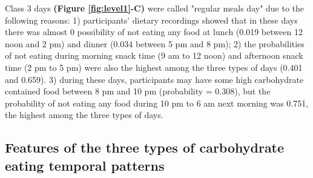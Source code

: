 Class 3 days \textbf{(Figure \ref{fig:level1}-C)} were called "regular meals day" due to the following reasons: 1) participants' dietary recordings showed that in these days there was almost 0 possibility of not eating any food at lunch (0.019 between 12 noon and 2 pm) and dinner (0.034 between 5 pm and 8 pm); 2) the probabilities of not eating during morning snack time (9 am to 12 noon) and afternoon snack time (2 pm to 5 pm) were also the highest among the three types of days (0.401 and 0.659). 3) during these days, participants may have some high carbohydrate contained food between 8 pm and 10 pm (probability = 0.308), but the probability of not eating any food during 10 pm to 6 am next morning was 0.751, the highest among the three types of days. \vspace{-0.5cm}


\subsection{Features of the three types of carbohydrate eating temporal patterns}


